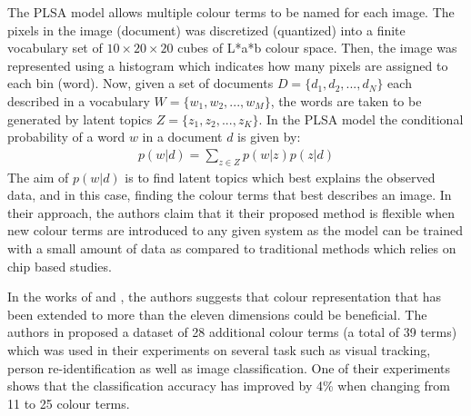 The PLSA model allows multiple colour terms to be named for each image. The pixels in the image (document) was discretized (quantized) into a finite vocabulary set of $10 \times 20 \times 20$ cubes of L*a*b colour space. Then, the image was represented using a histogram which indicates how many pixels are assigned to each bin (word). Now, given a set of documents $D = \{d_1, d_2, ... , d_N\}$ each described in a vocabulary $W = \{w_1, w_2, ... , w_M\}$, the words are taken to be generated by latent topics $Z = \{z_1, z_2, ... , z_K\}$. In the PLSA model the conditional probability of a word $w$ in a document $d$ is given by:
\begin{align}
    p(w|d) = \sum_{z\in Z}{p(w|z)p(z|d)}
\end{align}
The aim of $p(w|d)$ is to find latent topics which best explains the observed data, and in this case, finding the colour terms that best describes an image. In their approach, the authors claim that it their proposed method is flexible when new colour terms are introduced to any given system as the model can be trained with a small amount of data as compared to traditional methods which relies on chip based studies. 

In the works of  and , the authors suggests that colour representation that has been extended to more than the eleven dimensions could be beneficial. The authors in \cite{yu2018beyond} proposed a dataset of 28 additional colour terms (a total of 39 terms) which was used in their experiments on several task such as visual tracking, person re-identification as well as image classification. One of their experiments shows that the classification accuracy has improved by 4\% when changing from 11 to 25 colour terms. 



